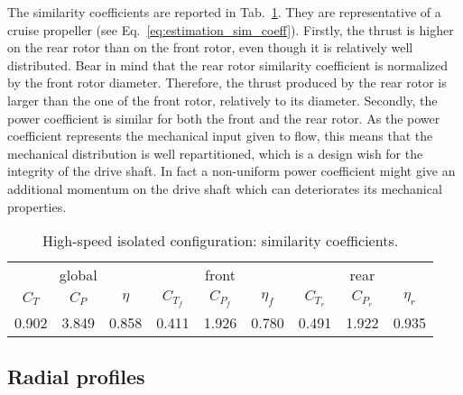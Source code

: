 The similarity coefficients are reported in 
Tab.~\ref{tab:dream_HS_sim_coeff}. 
They are representative of a cruise
propeller (see Eq.~\eqref{eq:estimation_sim_coeff}). 
Firstly, the thrust is higher
on the rear rotor than on the front rotor, even though it is
relatively well distributed. Bear in mind that the rear rotor
similarity coefficient is normalized by the front rotor diameter. Therefore, 
the thrust produced by the rear rotor is larger than the one of the front rotor, 
relatively to its diameter. 
Secondly, the power coefficient is similar for both the front and the
rear rotor. As the power coefficient represents the mechanical input
given to flow, this means that the mechanical distribution is 
well repartitioned, which is a design wish for the integrity of
the drive shaft. In fact a non-uniform power coefficient
might give an additional momentum on the drive shaft which can
deteriorates its mechanical properties.
\begin{table}[htp]
   \centering
  \begin{tabular}{ccc||ccc|ccc}
    \toprule
    \multicolumn{3}{c||}{global} & \multicolumn{3}{c|}{front} & \multicolumn{3}{c}{rear} \\
    $C_T$ & $C_P$ & $\eta$ & $C_{T_f}$ & $C_{P_f}$ & $\eta_f$ & $C_{T_r}$ & $C_{P_r}$ & $\eta_r$ \\
    \midrule
    0.902 & 3.849 & 0.858 & 0.411 & 1.926 & 0.780 & 0.491 & 1.922 & 0.935 \\
    \bottomrule
  \end{tabular}
  \caption{High-speed isolated configuration: similarity coefficients.}
  \label{tab:dream_HS_sim_coeff}
\end{table}

\subsection{Radial profiles}
\label{sub:dream_hs_radial_profiles}

